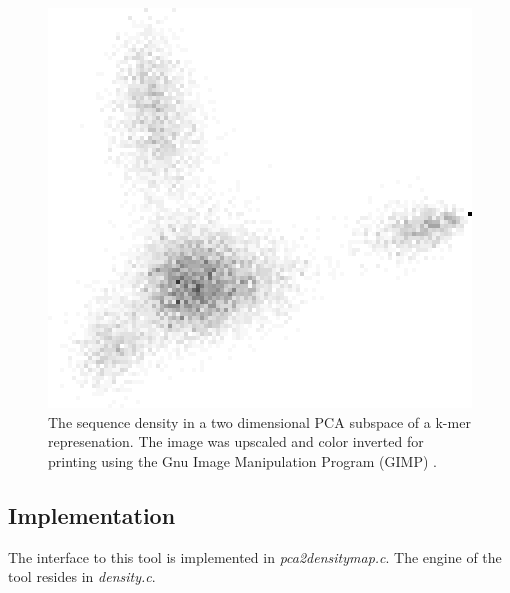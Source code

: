 \begin{figure}
  \begin{center}
    \includegraphics{pca-density.png}
    \caption{The sequence density in a two dimensional PCA subspace of
    a k-mer represenation. The image was upscaled and color inverted
    for printing using the Gnu Image Manipulation Program (GIMP)
    \cite{gimp}.}
    \label{fig-pca2densitymap}
  \end{center}
\end{figure}

\subsection{Implementation}
The interface to this tool is implemented in \emph{pca2densitymap.c}.
The engine of the tool resides in \emph{density.c}.
